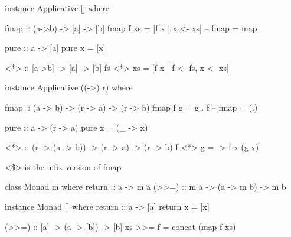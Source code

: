 \begin{haskellcode}
instance Applicative [] where

  fmap :: (a->b) -> [a] -> [b]
  fmap f xs = [f x | x <- xs]
  -- fmap = map
  
  pure :: a -> [a]
  pure x = [x]

  <*> :: [a->b] -> [a] -> [b]
  fs <*> xs = [f x | f <- fs, x <- xs]
\end{haskellcode}


\begin{haskellcode}
instance Applicative ((->) r) where

  fmap :: (a -> b) -> (r -> a) -> (r -> b)
  fmap f g = g . f
  -- fmap = (.)

  pure :: a -> (r -> a)
  pure x = (\_ -> x)

  <*> :: (r -> (a -> b)) -> (r -> a) -> (r -> b)
  f <*> g = \x -> f x (g x)  
\end{haskellcode}

<\$> is the infix version of fmap




\begin{haskellcode}
class Monad m where
  return :: a -> m a
  (>>=) :: m a -> (a -> m b) -> m b
\end{haskellcode}


\begin{haskellcode}
instance Monad [] where
  return :: a -> [a]
  return x = [x]

  (>>=) :: [a] -> (a -> [b]) -> [b]
  xs >>= f = concat (map f xs)
\end{haskellcode}

